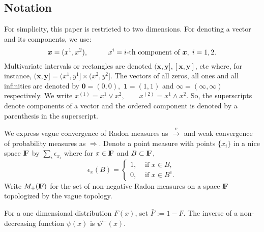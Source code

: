 \documentclass[11 pt]{amsart}
\numberwithin{equation}{section}
\begin{document}
 
 
 
 
 \subsection{Notation}\label{sec:notation}
{{For simplicity}}, this paper is restricted to two dimensions.
  For  denoting a vector and its components, we use:
$${\boldsymbol x} = (x^1, x^2), \hskip 1 cm x^i = \hbox{$i$-th component of } {\boldsymbol x}, \hskip 0.1 cm i = 1, 2.$$
{Multivariate intervals or rectangles are denoted $({\boldsymbol x},{\boldsymbol y}],
  [{\boldsymbol x},{\boldsymbol y}]$, etc where, for instance, $({\boldsymbol x},{\boldsymbol y}]= (x^1,y^1]\times (x^2,y^2].$}
The vectors of all zeros, all ones and all infinities are denoted by
${\boldsymbol 0}= (0, 0),$ ${\boldsymbol 1} = (1, 1)$ and
${\boldsymbol{\infty}} = (\infty, \infty)$
respectively. 
{We write}
$ x^{(1)} = x^1\vee x^2,\qquad  x^{(2)}=x^1\wedge x^2.$
So, the superscripts denote components of a vector and the ordered
component is denoted by a parenthesis in the superscript.

 We express  vague convergence \citep[page 173]{resnickbook:2007} of Radon measures as
$\stackrel{v}{\rightarrow}$ and
weak convergence of probability measures \cite[page
14]{billingsley:1999}
as $\Rightarrow$. Denote a point measure with points  $\{x_i\}$ in a
nice space  ${\mathop{\rm I\kern -0.20em F}\nolimits}$  by 
$\sum_i \epsilon_{x_i}$ where for $x\in {\mathop{\rm I\kern -0.20em F}\nolimits}$ and $B\subset {\mathop{\rm I\kern -0.20em F}\nolimits}$,
$$\epsilon_{x} (B)=\begin{cases}
1,& \text{ if }x \in B,\\
0,& \text{ if }x \in B^c.
\end{cases} $$
Write $M_+({\mathop{\rm I\kern -0.20em F}\nolimits})$ for  the set of non-negative Radon
measures on a space ${\mathop{\rm I\kern -0.20em F}\nolimits}$ topologized by the vague topology. 

{For a one dimensional
distribution $F(x)$,  set $\bar F:=1-F$.} The inverse of
a non-decreasing function $\psi (x)$ is $\psi^\leftarrow (x)$.
 
\end{document}
